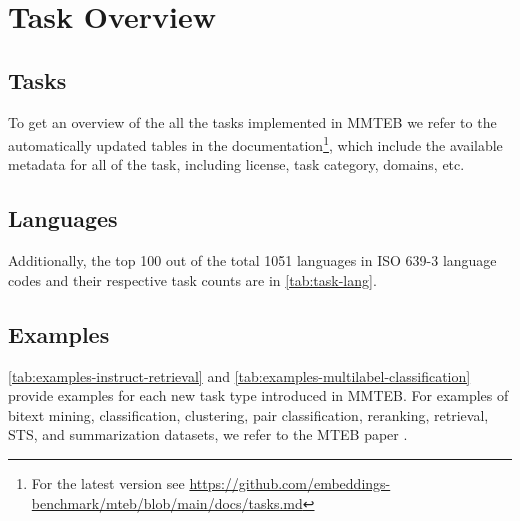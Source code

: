 \section{Task Overview}

\subsection{Tasks}
To get an overview of the all the tasks implemented in MMTEB we refer to the automatically updated tables in the documentation\footnote{For the latest version see \url{https://github.com/embeddings-benchmark/mteb/blob/main/docs/tasks.md}}, which include the available metadata for all of the task, including license, task category, domains, etc.

\subsection{Languages}
Additionally, the top 100 out of the total 1051 languages in ISO 639-3 language codes and their respective task counts are in \autoref{tab:task-lang}.



\subsection{Examples}
\autoref{tab:examples-instruct-retrieval} and \autoref{tab:examples-multilabel-classification} provide examples for each new task type introduced in MMTEB. For examples of bitext mining, classification, clustering, pair classification, reranking, retrieval, STS, and summarization datasets, we refer to the MTEB paper \cite{muennighoff2023mteb}.

